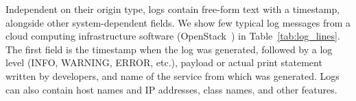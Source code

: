 
\begin{table}[!t]
\centering
\caption{Raw log messages from OpenStack cloud platform.}
\label{tab:log_lines}
\end{table}

Independent on their origin type, logs contain free-form text with a timestamp, alongside other system-dependent fields. We show few typical log messages from a cloud computing infrastructure software (OpenStack~\cite{openstack}) in Table~\ref{tab:log_lines}. The first field is the timestamp when the log was generated, followed by a log level (INFO, WARNING, ERROR, etc.), payload or actual print statement written by developers, and name of the service from which was generated. Logs can also contain host names and IP addresses, class names, and other features.

